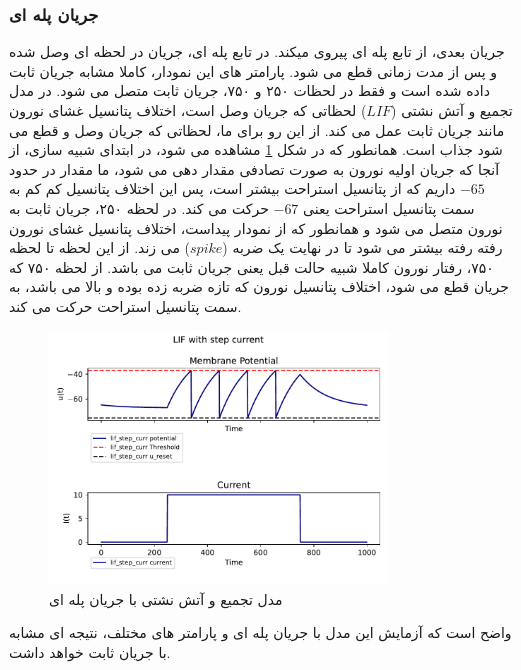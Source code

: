 \documentclass{article}
\begin{document}
            \subsubsection{جریان پله ای}
                جریان بعدی، از تابع پله ای پیروی میکند. در تابع پله ای، جریان در لحظه ای وصل شده و پس از مدت زمانی قطع می شود. پارامتر های این نمودار، کاملا مشابه جریان ثابت داده شده است و فقط در لحظات ۲۵۰ و ۷۵۰، جریان ثابت متصل می شود. در مدل تجمیع و آتش نشتی
                ($LIF$)
                لحظاتی که جریان وصل است، اختلاف پتانسیل غشای نورون مانند جریان ثابت عمل می کند. از این رو برای ما، لحظاتی که جریان وصل و قطع می شود جذاب است. همانطور که در شکل 
                \ref{fig:lif-step-curr} 
                مشاهده می شود، در ابتدای شبیه سازی، از آنجا که جریان اولیه نورون به صورت تصادفی مقدار دهی می شود، ما مقدار در حدود 
                $-65$ 
                داریم که از پتانسیل استراحت بیشتر است، پس این اختلاف پتانسیل کم کم به سمت پتانسیل استراحت یعنی 
                $-67$ 
                حرکت می کند. در لحظه ۲۵۰، جریان ثابت به نورون متصل می شود و همانطور که از نمودار پیداست، اختلاف پتانسیل غشای نورون رفته رفته بیشتر می شود تا در نهایت یک ضربه
                ($spike$)
                می زند. از این لحظه تا لحظه  ۷۵۰، رفتار نورون کاملا شبیه حالت قبل یعنی جریان ثابت می باشد. از لحظه ۷۵۰ که جریان قطع می شود، اختلاف پتانسیل نورون که تازه ضربه زده بوده و بالا می باشد، به سمت پتانسیل استراحت حرکت می کند.
                \begin{figure}[h]
                    \centering
                    \includegraphics[width=0.8\textwidth]{plots/LIF with step current.pdf} 
                    \caption{مدل تجمیع و آتش نشتی با جریان پله ای}
                    \label{fig:lif-step-curr}
                \end{figure}
                واضح است که آزمایش این مدل با جریان پله ای و پارامتر های مختلف، نتیجه ای مشابه با جریان ثابت خواهد داشت.
\end{document}
